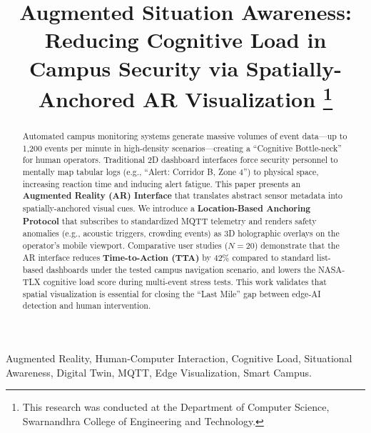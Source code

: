 \documentclass[conference]{IEEEtran}
\begin{document}
\title{Augmented Situation Awareness: Reducing Cognitive Load in Campus Security via Spatially-Anchored AR Visualization
\thanks{This research was conducted at the Department of Computer Science, Swarnandhra College of Engineering and Technology.}
}

\author{
}

\maketitle

\begin{abstract}
Automated campus monitoring systems generate massive volumes of event data---up to 1,200 events per minute in high-density scenarios---creating a ``Cognitive Bottle-neck'' for human operators. Traditional 2D dashboard interfaces force security personnel to mentally map tabular logs (e.g., ``Alert: Corridor B, Zone 4'') to physical space, increasing reaction time and inducing alert fatigue. This paper presents an \textbf{Augmented Reality (AR) Interface} that translates abstract sensor metadata into spatially-anchored visual cues. We introduce a \textbf{Location-Based Anchoring Protocol} that subscribes to standardized MQTT telemetry and renders safety anomalies (e.g., acoustic triggers, crowding events) as 3D holographic overlays on the operator's mobile viewport. Comparative user studies ($N=20$) demonstrate that the AR interface reduces \textbf{Time-to-Action (TTA)} by 42\% compared to standard list-based dashboards under the tested campus navigation scenario, and lowers the NASA-TLX cognitive load score during multi-event stress tests. This work validates that spatial visualization is essential for closing the ``Last Mile'' gap between edge-AI detection and human intervention.
\end{abstract}

\begin{IEEEkeywords}
Augmented Reality, Human-Computer Interaction, Cognitive Load, Situational Awareness, Digital Twin, MQTT, Edge Visualization, Smart Campus.
\end{IEEEkeywords}
\end{document}
